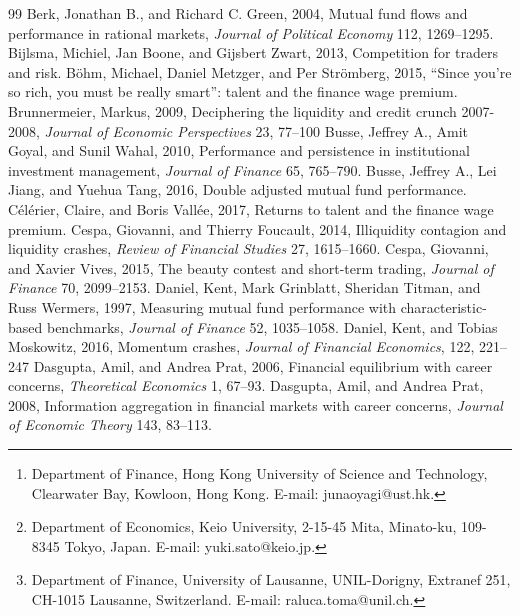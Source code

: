 \author{Jun Aoyagi\thanks{Department of Finance, Hong Kong University of Science and Technology, Clearwater Bay, Kowloon, Hong Kong. E-mail: junaoyagi@ust.hk.}\\[5pt]\small{HKUST} 
\and 
Yuki Sato\thanks{Department of Economics, Keio University, 2-15-45 Mita, Minato-ku, 109-8345 Tokyo, Japan. E-mail: yuki.sato@keio.jp.}\\[5pt]\small{Keio University}
\and 
Raluca S. Toma\thanks{Department of Finance, University of Lausanne, UNIL-Dorigny, Extranef 251, CH-1015 Lausanne, Switzerland. E-mail: raluca.toma@unil.ch.}\\[5pt]\small{University of Lausanne and SFI}}



\begin{thebibliography}{99}
\bibitem{} Berk, Jonathan B., and Richard C. Green, 2004, Mutual fund flows and performance in rational markets, {\it Journal of Political Economy} 112, 1269--1295.
\bibitem{} Bijlsma, Michiel, Jan Boone, and Gijsbert Zwart, 2013, Competition for traders and risk.
\bibitem{} B\"{o}hm, Michael, Daniel Metzger, and Per Str\"{o}mberg, 2015, ``Since you're so rich, you must be really smart'': talent and the finance wage premium.
 Brunnermeier, Markus, 2009, Deciphering the liquidity and credit crunch 2007-2008, {\it Journal of Economic Perspectives} 23, 77--100
\bibitem{} Busse, Jeffrey A., Amit Goyal, and Sunil Wahal, 2010, Performance and persistence in institutional investment management, {\it Journal of Finance} 65, 765--790.
\bibitem{} Busse, Jeffrey A., Lei Jiang, and Yuehua Tang, 2016, Double adjusted mutual fund performance.
\bibitem{} C\'{e}l\'{e}rier, Claire, and Boris Vall\'{e}e, 2017, Returns to talent and the finance wage premium.
\bibitem{} Cespa, Giovanni, and Thierry Foucault, 2014, Illiquidity contagion and liquidity crashes, {\it Review of Financial Studies} 27, 1615--1660.
\bibitem{} Cespa, Giovanni, and Xavier Vives, 2015, The beauty contest and short-term trading, {\it Journal
of Finance} 70, 2099--2153.
\bibitem{} Daniel, Kent, Mark Grinblatt, Sheridan Titman, and Russ Wermers, 1997, Measuring mutual fund performance with characteristic-based benchmarks, {\it Journal of Finance} 52, 1035--1058.
\bibitem{} Daniel, Kent, and Tobias Moskowitz, 2016, Momentum crashes, {\it Journal of Financial Economics}, 122, 221--247
\bibitem{} Dasgupta, Amil, and Andrea Prat, 2006, Financial equilibrium with career concerns, {\it Theoretical
Economics} 1, 67--93.
\bibitem{} Dasgupta, Amil, and Andrea Prat, 2008, Information aggregation in financial markets with career concerns, {\it Journal of Economic Theory} 143, 83--113.

\end{thebibliography}
